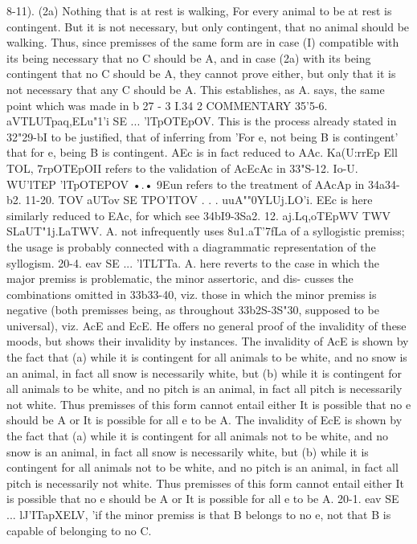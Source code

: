 {{{{{8-11). (2a) Nothing that is at rest is walking, For every animal
to be at rest is contingent. But it is not necessary, but only
contingent, that no animal should be walking. Thus, since
premisses of the same form are in case (I) compatible with its
being necessary that no C should be A, and in case (2a) with its
being contingent that no C should be A, they cannot prove either,
but only that it is not necessary that any C should be A. This
establishes, as A. says, the same point which was made in b 27 - 3 I.34 2
COMMENTARY
35'5-6. aVTLUTpaq,ELu"1'i SE ... 'lTpOTEpOV. This is the process
already stated in 32"29-bI to be justified, that of inferring from
'For e, not being B is contingent' that for e, being B is contingent.
AEc is in fact reduced to AAc. Ka(U:rrEp Ell TOL, 7rpOTEpOII refers
to the validation of AcEcAc in 33"S-12.
Io-U. WU'lTEP 'lTpOTEPOV •.• 9Eun refers to the treatment of
AAcAp in 34a34-b2.
11-20. TOV aUTov SE TPO'ITOV . . . uuA""0YLUj.LO'i. EEc is here
similarly reduced to EAc, for which see 34bI9-3Sa2.
12. aj.Lq,oTEpWV TWV SLaUT"1j.LaTWV. A. not infrequently uses
8u1.aT'7fLa of a syllogistic premiss; the usage is probably connected
with a diagrammatic representation of the syllogism.
20-4. eav SE ... 'lTLTTa. A. here reverts to the case in which
the major premiss is problematic, the minor assertoric, and dis-
cusses the combinations omitted in 33b33-40, viz. those in which
the minor premiss is negative (both premisses being, as throughout
33b2S-3S"30, supposed to be universal), viz. AcE and EcE. He
offers no general proof of the invalidity of these moods, but shows
their invalidity by instances. The invalidity of AcE is shown by
the fact that (a) while it is contingent for all animals to be white,
and no snow is an animal, in fact all snow is necessarily white,
but (b) while it is contingent for all animals to be white, and no
pitch is an animal, in fact all pitch is necessarily not white. Thus
premisses of this form cannot entail either It is possible that no
e should be A or It is possible for all e to be A.
The invalidity of EcE is shown by the fact that (a) while it is
contingent for all animals not to be white, and no snow is an
animal, in fact all snow is necessarily white, but (b) while it is
contingent for all animals not to be white, and no pitch is an
animal, in fact all pitch is necessarily not white. Thus premisses
of this form cannot entail either It is possible that no e should be
A or It is possible for all e to be A.
20-1. eav SE ... lJ'ITapXELV, 'if the minor premiss is that B
belongs to no e, not that B is capable of belonging to no C.
}}}}}
